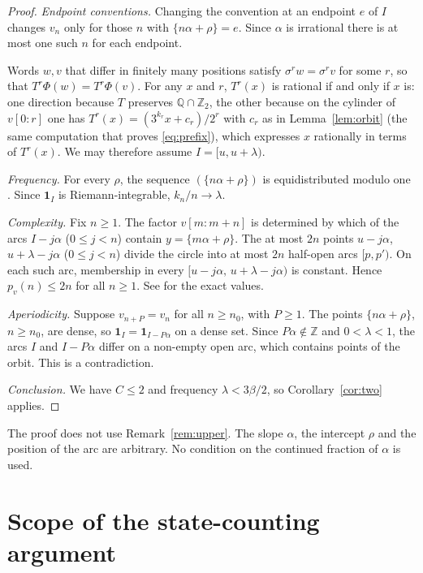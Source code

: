 \documentclass[11pt]{amsart}
\theoremstyle{definition}
\theoremstyle{remark}
\newcommand{\Z}{\mathbb{Z}}
\newcommand{\Q}{\mathbb{Q}}
\begin{document}
\begin{proof}
\emph{Endpoint conventions.} Changing the convention at an endpoint $e$ of $I$ changes $v_n$ only for those $n$ with $\{n\alpha+\rho\}=e$. Since $\alpha$ is irrational there is at most one such $n$ for each endpoint.

Words $w,v$ that differ in finitely many positions satisfy $\sigma^r w=\sigma^r v$ for some $r$, so that $T^r\Phi(w)=T^r\Phi(v)$. For any $x$ and $r$, $T^r(x)$ is rational if and only if $x$ is: one direction because $T$ preserves $\Q\cap\Z_2$, the other because on the cylinder of $v[0:r]$ one has $T^r(x)=(3^{k_r}x+c_r)/2^r$ with $c_r$ as in Lemma~\ref{lem:orbit} (the same computation that proves \eqref{eq:prefix}), which expresses $x$ rationally in terms of $T^r(x)$. We may therefore assume $I=[u,u+\lambda)$.

\emph{Frequency.} For every $\rho$, the sequence $(\{n\alpha+\rho\})$ is equidistributed modulo one \cite{Wey16,KN74}. Since $\mathbf 1_I$ is Riemann-integrable, $k_n/n\to\lambda$.

\emph{Complexity.} Fix $n\ge1$. The factor $v[m:m+n]$ is determined by which of the arcs $I-j\alpha$ ($0\le j<n$) contain $y=\{m\alpha+\rho\}$. The at most $2n$ points $u-j\alpha$, $u+\lambda-j\alpha$ ($0\le j<n$) divide the circle into at most $2n$ half-open arcs $[p,p')$. On each such arc, membership in every $[u-j\alpha,\,u+\lambda-j\alpha)$ is constant. Hence $p_v(n)\le 2n$ for all $n\ge1$. See \cite{AB98} for the exact values.

\emph{Aperiodicity.} Suppose $v_{n+P}=v_n$ for all $n\ge n_0$, with $P\ge1$. The points $\{n\alpha+\rho\}$, $n\ge n_0$, are dense, so $\mathbf 1_I=\mathbf 1_{I-P\alpha}$ on a dense set. Since $P\alpha\notin\Z$ and $0<\lambda<1$, the arcs $I$ and $I-P\alpha$ differ on a non-empty open arc, which contains points of the orbit. This is a contradiction.

\emph{Conclusion.} We have $C\le2$ and frequency $\lambda<3\beta/2$, so Corollary~\ref{cor:two} applies.
\end{proof}

The proof does not use Remark~\ref{rem:upper}. The slope $\alpha$, the intercept $\rho$ and the position of the arc are arbitrary. No condition on the continued fraction of $\alpha$ is used.

\section{Scope of the state-counting argument}\label{sec:scope}
\end{document}
